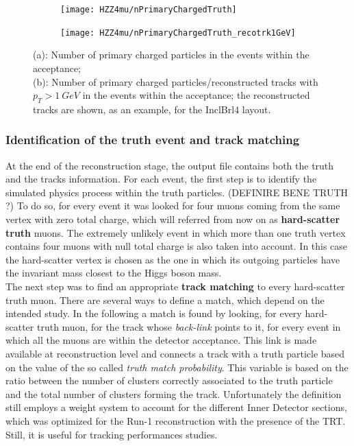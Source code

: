 \documentclass[a4paper,twoside,12pt]{article}
\begin{document}
\begin{figure}
\begin{subfigure}{.5\linewidth}
\texttt{[image: HZZ4mu/nPrimaryChargedTruth]}
\caption{ }
\label{fig:HZZ4mu:nPrimaryChargedTruth}
\end{subfigure}
\begin{subfigure}{.5\linewidth}
\texttt{[image: HZZ4mu/nPrimaryChargedTruth\_recotrk1GeV]}
\caption{ }
\label{fig:HZZ4mu:nPrimaryChargedTruth_recotrk1GeV}
\end{subfigure}
\caption{(a): Number of primary charged particles in the events within the acceptance;\\
                  (b): Number of primary charged particles/reconstructed tracks with $p_{T} > 1\ GeV$ in the events within the acceptance; the reconstructed tracks are shown, as an example, for the InclBrl4 layout.}
\label{fig:HZZ4mu:nTracks}
\end{figure}

\subsubsection*{Identification of the truth event and track matching}
At the end of the reconstruction stage, the output file contains both the truth and the tracks information. For
each event, the first step is to identify the simulated physics process within the truth particles. (DEFINIRE BENE TRUTH ?)
To do so, for every event it was looked for four muons coming from the same vertex with zero total charge, which
will referred from now on as \textbf{hard-scatter truth} muons. The extremely unlikely event in which more
than one truth vertex contains four muons with null total charge is also taken into account. In this case 
the hard-scatter vertex is chosen as the one in which its outgoing particles have the invariant mass closest to the Higgs boson mass.\\

The next step was to find an appropriate \textbf{track matching} to every hard-scatter truth muon. There
are several ways to define a match, which depend on the intended study. In the following a match is found by looking,
for every hard-scatter truth muon, for the track whose \textit{back-link} points to it, for every event in which all the muons are within
the detector acceptance. This link is made available at reconstruction
level and connects a track with a truth particle based on the value of the so called \textit{truth match probability}.
This variable is based on the ratio between the number of clusters correctly associated to the truth particle and the total number
of clusters forming the track. Unfortunately the definition still employs a weight system to account for the different Inner Detector sections,
which was optimized for the Run-1 reconstruction with the presence of the TRT. Still, it is useful for tracking performances studies.
\end{document}

